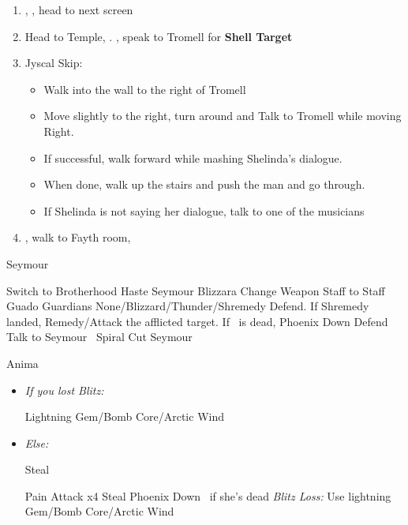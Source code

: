 \begin{enumerate}[resume]
  \item \sd, \cs[0:40], head to next screen
  \item Head to Temple, \sd. \save, speak to Tromell for \textbf{Shell Target}
  \item Jyscal Skip:
        \begin{itemize}
          \item Walk into the wall to the right of Tromell
          \item Move slightly to the right, turn around and Talk to Tromell while moving Right.
          \item If successful, walk forward while mashing Shelinda's dialogue.
          \item When done, walk up the stairs and push the man and go through.
          \item If Shelinda is not saying her dialogue, talk to one of the musicians
        \end{itemize}
  \item \sd, walk to Fayth room, \cs[2:10]
\end{enumerate}
\begin{battle}[3000]{Seymour}
  \begin{itemize}
    \tidusf Switch to Brotherhood
    \tidusf Haste \tidus
    \enemyf Seymour Blizzara
    \yunaf Change Weapon Staff to Staff
    \enemyf Guado Guardians None/Blizzard/Thunder/Shremedy
    \kimahrif Defend. If Shremedy landed, Remedy/Attack the afflicted target. If \yuna\ is dead, Phoenix Down
    \switch{\yuna}{\auron}
    \auronf Defend
    \tidusf Talk to Seymour
    \tidusf \od\ Spiral Cut Seymour
  \end{itemize}
\end{battle}
\begin{battle}[18000]{Anima}
  \begin{itemize}
    \switch{\tidus}{\wakka}
    \wakkaf Change Weapon
    \item \textit{If you lost Blitz:}
          \begin{itemize}
            \kimahrif Lightning Gem/Bomb Core/Arctic Wind
          \end{itemize}
    \item \textit{Else:}
          \begin{itemize}
            \kimahrif Steal
          \end{itemize}
          \enemyf Pain
          \tidusf Attack x4
          \rikkuf Steal
          \rikkuf Phoenix Down \yuna\ if she's dead
          \rikkuf \textit{Blitz Loss:} Use lightning Gem/Bomb Core/Arctic Wind
  \end{itemize}
\end{battle}
